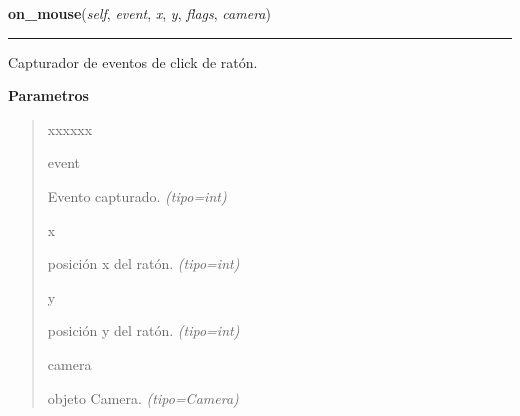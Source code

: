 \hspace{.8\funcindent}\begin{boxedminipage}{\funcwidth}

    \raggedright \textbf{on\_mouse}(\textit{self}, \textit{event}, \textit{x}, \textit{y}, \textit{flags}, \textit{camera})

    \vspace{-1.5ex}

    \rule{\textwidth}{0.5\fboxrule}
\setlength{\parskip}{2ex}
Capturador de eventos de click de ratón.

\setlength{\parskip}{1ex}
      \textbf{Parametros}
      \vspace{-1ex}

      \begin{quote}
        \begin{Ventry}{xxxxxx}

          \item[event]


Evento capturado.
            {\it (tipo=int)}

          \item[x]


posición x del ratón.
            {\it (tipo=int)}

          \item[y]


posición y del ratón.
            {\it (tipo=int)}

          \item[camera]


objeto Camera.
            {\it (tipo=Camera)}

        \end{Ventry}

      \end{quote}

    \end{boxedminipage}

    \label{src:cameras:Cameras:check_cameras}

    \vspace{0.5ex}

